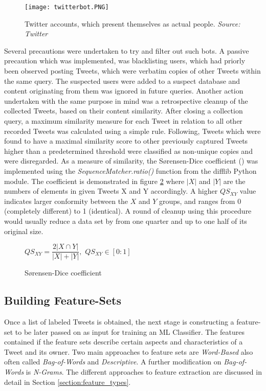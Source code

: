 		\begin{figure}[h]
			\centering
			\texttt{[image: twitterbot.PNG]}
			\captionsetup{width=0.8\textwidth}
			\caption[Fake Twitter Accounts]{Twitter accounts, which present themselves as actual people. \textit{Source: Twitter}}
			\label{fig:twitterbot}	
		\end{figure}
		
		\noindent
		Several precautions were undertaken to try and filter out such bots. A passive precaution which was implemented, was blacklisting users, which had priorly been observed posting Tweets, which were verbatim copies of other Tweets within the same query. The suspected users were added to a suspect database and content originating from them was ignored in future queries. Another action undertaken with the same purpose in mind was a retrospective cleanup of the collected Tweets, based on their content similarity. After closing a collection query, a maximum similarity measure for each Tweet in relation to all other recorded Tweets was calculated using a simple rule. Following, Tweets which were found to have a maximal similarity score to other previously captured Tweets  higher than a predetermined threshold were classified as non-unique copies and were disregarded. As a measure of similarity, the S\o rensen-Dice coefficient (\cite{sorensen1948method}) was implemented  using the \textit{SequenceMatcher.ratio()} function from the difflib Python module. The coefficient is demonstrated in figure \ref{fig:sorenson_dice} where $|X|$ and $|Y|$ are the numbers of elements in given Tweets X and Y accordingly. A higher $ QS_{XY} $ value indicates larger conformity between the $ X $ and $ Y $ groups, and ranges from 0 (completely different) to 1 (identical). A round of cleanup using this procedure would usually reduce a data set by from one quarter and up to one half of its original size.
		
		\begin{figure}[h]
			\begin{center}
				$QS_{XY} = \dfrac{2|X\cap Y|}{|X|+|Y|},$ \hspace{10pt}  $QS_{XY} \in [0:1]$
			\end{center}
			\caption{S\o rensen-Dice coefficient}
			\label{fig:sorenson_dice}
		\end{figure}
		
	\subsection{Building Feature-Sets}
	\label{build_features}
	Once a list of labeled Tweets is obtained, the next stage is constructing a feature-set to be later passed on as input for training an ML Classifier. The features contained if the feature sets describe certain aspects and characteristics of a Tweet and its owner. Two main approaches to feature sets are \textit{Word-Based} also often called \textit{Bag-of-Words} and \textit{Descriptive}. A further modification on \textit{Bag-of-Words} is \textit{N-Grams}. The different approaches to feature extraction are discussed in detail in Section \ref{section:feature_types}.
	
